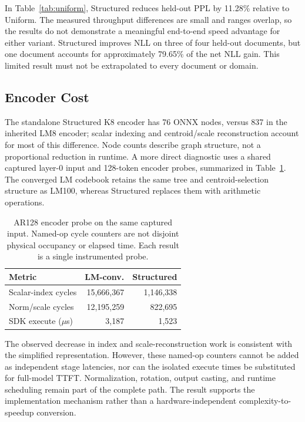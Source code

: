 \documentclass[conference,a4paper,10pt]{IEEEtran}
\begin{document}
In Table~\ref{tab:uniform}, Structured reduces held-out PPL by 11.28\% relative to Uniform. The measured throughput differences are small and ranges overlap, so the results do not demonstrate a meaningful end-to-end speed advantage for either variant. Structured improves NLL on three of four held-out documents, but one document accounts for approximately 79.65\% of the net NLL gain. This limited result must not be extrapolated to every document or domain.

\subsection{Encoder Cost}
The standalone Structured K8 encoder has 76 ONNX nodes, versus 837 in the inherited LM8 encoder; scalar indexing and centroid/scale reconstruction account for most of this difference. Node counts describe graph structure, not a proportional reduction in runtime. A more direct diagnostic uses a shared captured layer-0 input and 128-token encoder probes, summarized in Table~\ref{tab:encoder}. The converged LM codebook retains the same tree and centroid-selection structure as LM100, whereas Structured replaces them with arithmetic operations.

\begin{table}[t]
\caption{AR128 encoder probe on the same captured input. Named-op cycle counters are not disjoint physical occupancy or elapsed time. Each result is a single instrumented probe.}
\label{tab:encoder}
\centering
\setlength{\tabcolsep}{4pt}
\begin{tabular}{@{}lrr@{}}
\toprule
Metric & LM-conv. & Structured\\
\midrule
Scalar-index cycles & 15,666,367 & 1,146,338\\
Norm/scale cycles & 12,195,259 & 822,695\\
SDK execute ($\mu$s) & 3,187 & 1,523\\
\bottomrule
\end{tabular}
\end{table}

The observed decrease in index and scale-reconstruction work is consistent with the simplified representation. However, these named-op counters cannot be added as independent stage latencies, nor can the isolated execute times be substituted for full-model TTFT. Normalization, rotation, output casting, and runtime scheduling remain part of the complete path. The result supports the implementation mechanism rather than a hardware-independent complexity-to-speedup conversion.
\end{document}
